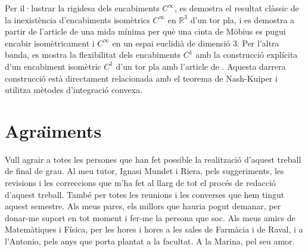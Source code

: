 \documentclass[11pt,a4paper,openright,oneside]{book}
\numberwithin{equation}{section}
\theoremstyle{definition}
\begin{document}
Per il·lustrar la rigidesa dels encabiments $C^\infty$, es demostra el resultat clàssic de la inexistència d'encabiments isomètrics $C^\infty$ en $\mathbb R^3$ d'un tor pla, i es demostra a partir de l'article de \citet{schwartz2024} una mida mínima per què una cinta de Möbius es pugui encabir isomètricament i $C^\infty$ en un espai euclidià de dimensió 3. Per l'altra banda, es mostra la flexibilitat dels encabiments $C^1$ amb la construcció explícita d'un encabiment isomètric $C^1$ d'un tor pla amb l'article de \citet{borrelli2013}. Aquesta darrera construcció està directament relacionada amb el teorema de Nash-Kuiper i utilitza mètodes d'integració convexa.

\newpage 


\section*{Agra\"{\i}ments}
Vull agrair a totes les persones que han fet possible la realització d'aquest treball de final de grau.
Al meu tutor, Ignasi Mundet i Riera, pels suggeriments, les revisions i les correccions que m'ha fet al llarg de tot el procés de redacció d'aquest treball. També per totes les reunions i les converses que hem tingut aquest semestre.
Als meus pares, els millors que hauria pogut demanar, per donar-me suport en tot moment i fer-me la persona que soc.
Als meus amics de Matemàtiques i Física, per les hores i hores a les sales de Farmàcia i de Raval, i a l'Antonio, pels anys que porta plantat a la facultat.
A la Marina, pel seu amor.

\newpage

\tableofcontents

\newpage








%



\normalfont
\end{document}
